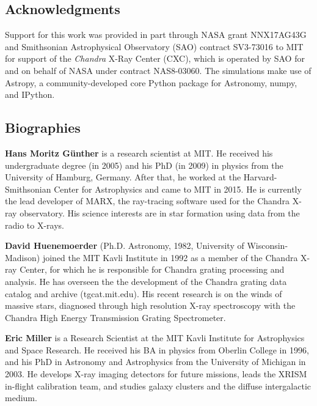 \documentclass[12pt]{spieman}  %
\begin{document}
\begin{spacing}{2}
\subsection* {Acknowledgments}
Support for this work was provided in part through NASA grant NNX17AG43G and
Smithsonian Astrophysical Observatory (SAO) contract SV3-73016 to MIT
for support of the {\em Chandra} X-Ray Center (CXC), which is operated
by SAO for and on behalf of NASA under contract NAS8-03060.  The
simulations make use of Astropy, a community-developed core Python
package for Astronomy\cite{astropy:2022}, numpy\cite{numpy}, and IPython\cite{IPython}.




\subsection*{Biographies}
\vspace{2ex}\noindent\textbf{Hans Moritz G\"unther} is a research scientist at MIT. He received his undergraduate degree (in 2005) and his PhD (in 2009) in physics from the University of Hamburg, Germany. After that, he worked at the Harvard-Smithsonian Center for Astrophysics and came to MIT in 2015. He is currently the lead developer of MARX, the ray-tracing software used for the Chandra X-ray observatory. His science interests are in star formation using data from the radio to X-rays.


\vspace{2ex}\noindent\textbf{David Huenemoerder} (Ph.D. Astronomy, 1982, University of
Wisconsin-Madison) joined the MIT Kavli Institute in 1992 as a
member of the Chandra X-ray Center, for which he is responsible
for Chandra grating processing and analysis.  He has overseen the
the development of the Chandra grating data catalog and
archive (tgcat.mit.edu).  His recent research is on the winds of
massive stars, diagnosed through high resolution X-ray
spectroscopy with the Chandra High Energy Transmission Grating
Spectrometer.


\vspace{2ex}\noindent\textbf{Eric Miller} is a Research Scientist at the MIT Kavli Institute for Astrophysics and Space Research. He received his BA in physics from Oberlin College in 1996, and his PhD in Astronomy and Astrophysics from the University of Michigan in 2003. He develops X-ray imaging detectors for future missions, leads the XRISM in-flight calibration team, and studies galaxy clusters and the diffuse intergalactic medium.


\end{spacing}
\end{document}
